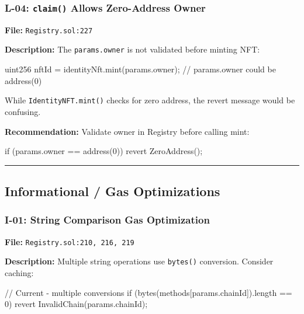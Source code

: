 \documentclass[
]{article}
\newenvironment{Shaded}{}{}
\newcommand{\NormalTok}[1]{#1}
\begin{document}
\subsubsection{\texorpdfstring{L-04: \texttt{claim()} Allows
Zero-Address
Owner}{L-04: claim() Allows Zero-Address Owner}}\label{l-04-claim-allows-zero-address-owner}

\textbf{File:} \texttt{Registry.sol:227}

\textbf{Description:} The \texttt{params.owner} is not validated before
minting NFT:

\begin{Shaded}
\begin{Highlighting}[]
\NormalTok{uint256 nftId = identityNft.mint(params.owner);  // params.owner could be address(0)}
\end{Highlighting}
\end{Shaded}

While \texttt{IdentityNFT.mint()} checks for zero address, the revert
message would be confusing.

\textbf{Recommendation:} Validate owner in Registry before calling mint:

\begin{Shaded}
\begin{Highlighting}[]
\NormalTok{if (params.owner == address(0)) revert ZeroAddress();}
\end{Highlighting}
\end{Shaded}

\begin{center}\rule{0.5\linewidth}{0.5pt}\end{center}

\subsection{Informational / Gas
Optimizations}\label{informational--gas-optimizations}

\subsubsection{I-01: String Comparison Gas
Optimization}\label{i-01-string-comparison-gas-optimization}

\textbf{File:} \texttt{Registry.sol:210,\ 216,\ 219}

\textbf{Description:} Multiple string operations use \texttt{bytes()}
conversion. Consider caching:

\begin{Shaded}
\begin{Highlighting}[]
\NormalTok{// Current {-} multiple conversions}
\NormalTok{if (bytes(methods[params.chainId]).length == 0) revert InvalidChain(params.chainId);}
\end{Highlighting}
\end{Shaded}
\end{document}

